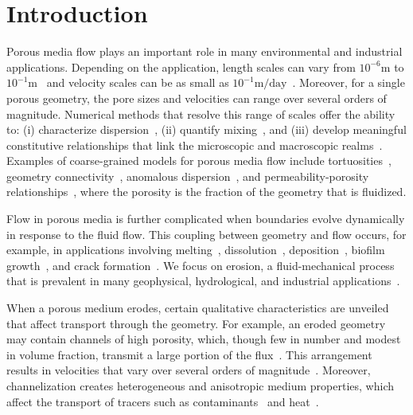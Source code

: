 \documentclass{jfm}
\begin{document}
\section{Introduction}
\label{sec:intro}
Porous media flow plays an important role in many environmental and
industrial applications.  Depending on the application, length scales
can vary from $10^{-6}\mathrm{m}$ to
$10^{-1}\mathrm{m}$~\citep{mil-chr-imh-mcb-ped1998} and velocity scales
can be as small as $10^{-1}\mathrm{m/day}$~\citep{kut-scr-dav-ham1995}.
Moreover, for a single porous geometry, the pore sizes and velocities
can range over several orders of magnitude. Numerical methods that
resolve this range of scales offer the ability to: (i) characterize
dispersion~\citep{saf1959}, (ii) quantify
mixing~\citep{leb-den-dav-bol-car-dec-bou2011, den-leb-eng-bij2011}, and
(iii) develop meaningful constitutive relationships that link the
microscopic and macroscopic realms~\citep{mil-chr-imh-mcb-ped1998}.
Examples of coarse-grained models for porous media flow include
tortuosities~\citep{mat-kha-koz2008, dud-koz-mat2011, kop-kat-tim1996},
geometry connectivity~\citep{knu-car2005}, anomalous
dispersion~\citep{den-cor-sch-ber2004}, and permeability-porosity
relationships~\citep{dar-mcc1998, car1937}, where the porosity is the
fraction of the geometry that is fluidized.

Flow in porous media is further complicated when boundaries evolve 
dynamically in response to the fluid flow. This coupling between
geometry and flow occurs, for example, in applications involving
melting~\citep{bec-vis1998, rycroft2016asymmetric, jambon2018singular,
favier2019rayleigh, morrow2019moving},
dissolution~\citep{kan-zha-che-he2002, mac2015shape, moo2017,
wykes2018self}, deposition~\citep{joh-eli1995, hewett2018modelling},
biofilm growth~\citep{tan-val-wer2015}, and crack
formation~\citep{cho2019crack}. We focus on erosion, a fluid-mechanical
process that is prevalent in many geophysical, hydrological, and
industrial applications~\citep{ris-moo-chi-she-zha2012,
berhanu2012shape, hewett2017evolution, lachaussee2018competitive,
lopez2018cfd, allen2019sde, amin2019role}.

When a porous medium erodes, certain qualitative characteristics are
unveiled that affect transport through the geometry.  For example, an
eroded geometry may contain channels of high porosity, which, though few
in number and modest in volume fraction, transmit a large portion of the
flux~\citep{qua-moo2018}. This arrangement results in velocities that
vary over several orders of magnitude~\citep{all-hea-lab-rei2002}.
Moreover, channelization creates heterogeneous and anisotropic medium
properties, which affect the transport of tracers such as
contaminants~\citep{cve-che-wen1996, dag1987, kon-bre1978} and
heat~\citep{nil-sto1990, ree-sto1995}.
\end{document}
